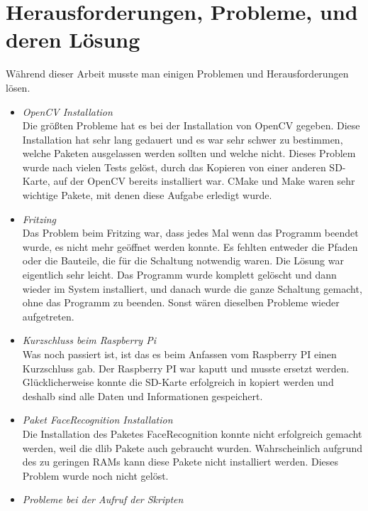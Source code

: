 	\section{Herausforderungen, Probleme, und deren Lösung}
	W{\"a}hrend dieser Arbeit musste man einigen Problemen und Herausforderungen lösen.
	\begin{itemize}
		\item \textit{OpenCV Installation}\\
		
		Die gr{\"o}ßten Probleme hat es bei der Installation von OpenCV gegeben. Diese Installation hat sehr lang gedauert und es war sehr schwer zu bestimmen, welche Paketen ausgelassen werden sollten und welche nicht. Dieses Problem wurde nach vielen Tests gel{\"o}st, durch das Kopieren von einer anderen SD-Karte, auf der OpenCV bereits installiert war. CMake und Make waren sehr wichtige Pakete, mit denen diese Aufgabe erledigt wurde.
		\item \textit{Fritzing} \\
		
		Das Problem beim Fritzing war, dass jedes Mal wenn das Programm beendet wurde, es nicht mehr ge{\"o}ffnet werden konnte. Es fehlten entweder die Pfaden oder die Bauteile, die f{\"u}r  die Schaltung notwendig waren. Die L{\"o}sung war eigentlich sehr leicht. Das Programm wurde komplett gel{\"o}scht und dann wieder im System installiert, und danach wurde die ganze Schaltung gemacht, ohne das Programm zu beenden. Sonst wären dieselben Probleme wieder aufgetreten.
		\item \textit{Kurzschluss beim Raspberry Pi}\\
		
		Was noch passiert ist, ist das es beim Anfassen vom Raspberry PI einen Kurzschluss gab. Der Raspberry PI war kaputt und musste ersetzt werden. Glücklicherweise konnte die SD-Karte erfolgreich in kopiert werden und deshalb sind alle Daten und Informationen gespeichert.
		
		\item \textit{Paket FaceRecognition Installation} \\
		
		Die Installation des Paketes FaceRecognition konnte nicht erfolgreich gemacht werden, weil die dlib Pakete auch gebraucht wurden. Wahrscheinlich aufgrund des zu geringen RAMs kann diese Pakete nicht installiert werden. Dieses Problem wurde noch nicht gel{\"o}st.
		
		\item \textit{Probleme bei der Aufruf der Skripten } \\
		

\end{itemize}
